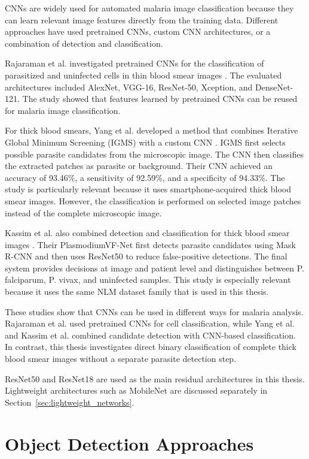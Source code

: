 CNNs are widely used for automated malaria image classification because they can learn relevant image features directly from the training data. Different approaches have used pretrained CNNs, custom CNN architectures, or a combination of detection and classification.

Rajaraman et al. investigated pretrained CNNs for the classification of parasitized and uninfected cells in thin blood smear images \cite{Rajaraman2018}. The evaluated architectures included AlexNet, VGG-16, ResNet-50, Xception, and DenseNet-121. The study showed that features learned by pretrained CNNs can be reused for malaria image classification.

For thick blood smears, Yang et al. developed a method that combines Iterative Global Minimum Screening (IGMS) with a custom CNN \cite{Yang2020}. IGMS first selects possible parasite candidates from the microscopic image. The CNN then classifies the extracted patches as parasite or background. Their CNN achieved an accuracy of 93.46\%, a sensitivity of 92.59\%, and a specificity of 94.33\%. The study is particularly relevant because it uses smartphone-acquired thick blood smear images. However, the classification is performed on selected image patches instead of the complete microscopic image.

Kassim et al. also combined detection and classification for thick blood smear images \cite{Kassim2021}. Their PlasmodiumVF-Net first detects parasite candidates using Mask R-CNN and then uses ResNet50 to reduce false-positive detections. The final system provides decisions at image and patient level and distinguishes between P. falciparum, P. vivax, and uninfected samples. This study is especially relevant because it uses the same NLM dataset family that is used in this thesis.

These studies show that CNNs can be used in different ways for malaria analysis. Rajaraman et al. used pretrained CNNs for cell classification, while Yang et al. and Kassim et al. combined candidate detection with CNN-based classification. In contrast, this thesis investigates direct binary classification of complete thick blood smear images without a separate parasite detection step.

ResNet50 and ResNet18 are used as the main residual architectures in this thesis. Lightweight architectures such as MobileNet are discussed separately in Section~\ref{sec:lightweight_networks}.

\section{Object Detection Approaches}
\label{sec:object_detection}

